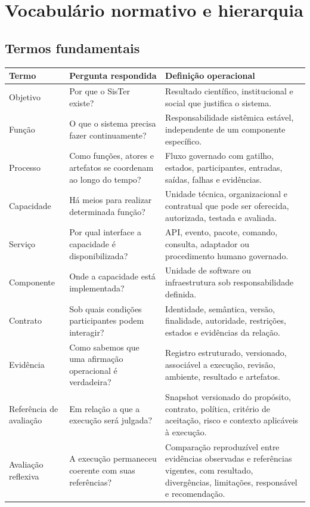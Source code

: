 \documentclass[11pt,a4paper,oneside]{article}
\begin{document}
\section{Vocabulário normativo e hierarquia}

\subsection{Termos fundamentais}
\begin{longtable}{P{3.2cm}P{5.6cm}P{6.0cm}}
\toprule
\textbf{Termo} & \textbf{Pergunta respondida} & \textbf{Definição operacional} \\
\midrule
\endhead
Objetivo & Por que o SisTer existe? & Resultado científico, institucional e social que justifica o sistema. \\
Função & O que o sistema precisa fazer continuamente? & Responsabilidade sistêmica estável, independente de um componente específico. \\
Processo & Como funções, atores e artefatos se coordenam ao longo do tempo? & Fluxo governado com gatilho, estados, participantes, entradas, saídas, falhas e evidências. \\
Capacidade & Há meios para realizar determinada função? & Unidade técnica, organizacional e contratual que pode ser oferecida, autorizada, testada e avaliada. \\
Serviço & Por qual interface a capacidade é disponibilizada? & API, evento, pacote, comando, consulta, adaptador ou procedimento humano governado. \\
Componente & Onde a capacidade está implementada? & Unidade de software ou infraestrutura sob responsabilidade definida. \\
Contrato & Sob quais condições participantes podem interagir? & Identidade, semântica, versão, finalidade, autoridade, restrições, estados e evidências da relação. \\
Evidência & Como sabemos que uma afirmação operacional é verdadeira? & Registro estruturado, versionado, associável a execução, revisão, ambiente, resultado e artefatos. \\
Referência de avaliação & Em relação a que a execução será julgada? & Snapshot versionado do propósito, contrato, política, critério de aceitação, risco e contexto aplicáveis à execução. \\
Avaliação reflexiva & A execução permaneceu coerente com suas referências? & Comparação reproduzível entre evidências observadas e referências vigentes, com resultado, divergências, limitações, responsável e recomendação. \\

\end{longtable}
\end{document}
